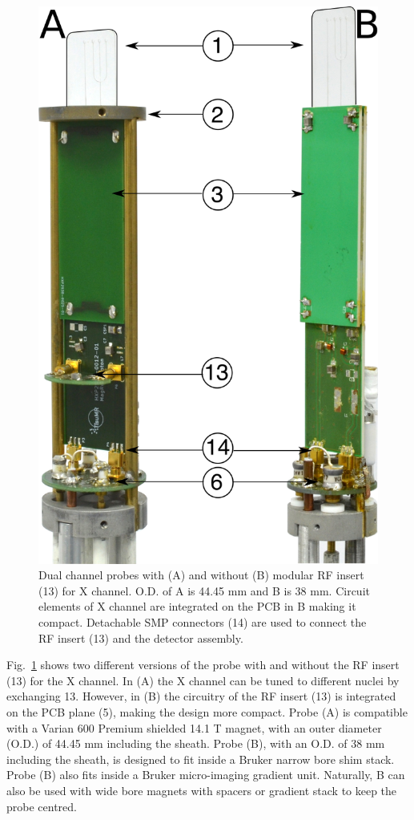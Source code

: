 \documentclass[preprint,5p]{elsarticle}
\newcommand{\fig}[1]{Fig.~\ref{#1}}
\begin{document}
\begin{figure}
\centering
\includegraphics[width=.5\linewidth,keepaspectratio=true]{./figures/ms5n17-tlp-im-181007-both-detectors.png}
\caption{Dual channel probes with (A) and without (B) modular RF insert (13) for X channel.
O.D. of A is 44.45 mm and B is 38 mm. Circuit elements of X channel are integrated on the
PCB in B making it compact. Detachable SMP connectors (14) are used to
connect the RF insert (13) and the detector assembly.}
\label{fig:ProbePhoto}
\end{figure}
\fig{fig:ProbePhoto} shows two different versions of the probe with and without the RF insert (13)
for the X channel. In (A) the X channel can be tuned to different nuclei by exchanging 13.
However, in (B) the circuitry of the RF insert (13) is integrated on the PCB plane (5),
making the design more compact.
 Probe (A) is compatible with a Varian 600 Premium shielded 14.1 T magnet, with an outer diameter (O.D.) of 44.45 mm including the sheath. Probe (B), with an
O.D. of 38 mm including the sheath, is designed to fit inside a
Bruker narrow bore shim stack.
Probe (B) also fits inside a Bruker micro-imaging gradient unit. Naturally, B can also be used with
wide bore magnets with spacers or gradient stack to keep the probe centred.
\end{document}
